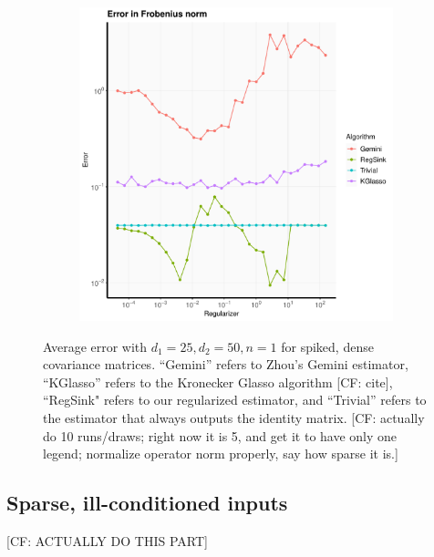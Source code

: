 \documentclass[aos]{imsart}
\theoremstyle{definition}
\numberwithin{equation}{section}
\newcommand{\CF}[1]{{\color{purple}[CF: #1]}}
\begin{document}
\begin{figure}
\begin{subfigure}[b]{0.3\textwidth}
     \end{subfigure}
     \hfill
     \begin{subfigure}[b]{0.3\textwidth}
         \centering
         \includegraphics[width=\textwidth]{./code/zhou-comparison/25-50-spiked-frob.pdf}
     \end{subfigure}
\caption{Average error with $d_1 = 25, d_2 = 50, n = 1$ for spiked, dense covariance matrices. ``Gemini'' refers to Zhou's Gemini estimator, ``KGlasso'' refers to the Kronecker Glasso algorithm \CF{cite}, ``RegSink" refers to our regularized estimator, and ``Trivial'' refers to the estimator that always outputs the identity matrix. \CF{actually do 10 runs/draws; right now it is 5, and get it to have only one legend; normalize operator norm properly, say how sparse it is.}}\label{fig:spiked}
\end{figure}

 
 \subsection{Sparse, ill-conditioned inputs} \CF{ACTUALLY DO THIS PART}
\end{document}
